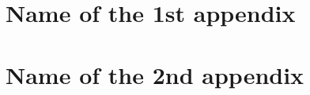 
\newpage


\appendix

\chapter{Name of the 1st appendix}
\thispagestyle{abstractAppendix} %


\lipsum



\chapter{Name of the 2nd appendix}
\thispagestyle{abstractAppendix} %


\lipsum[1]